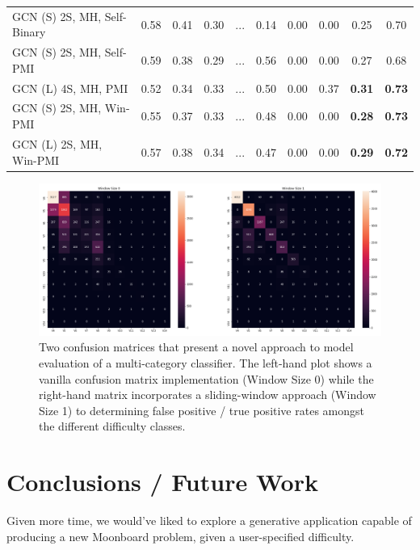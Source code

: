 \documentclass{article}
\begin{document}
\begin{table}[h!]
\begin{tabular}{@{}lccclccccc@{}}
GCN (S) 2S, MH, Self-Binary & 0.58  & 0.41  & 0.30  & ... & 0.14 & 0.00 & 0.00 & 0.25            & 0.70            \\
GCN (S) 2S, MH, Self-PMI    & 0.59  & 0.38  & 0.29  & ... & 0.56 & 0.00 & 0.00 & 0.27            & 0.68            \\
GCN (L) 4S, MH, PMI         & 0.52  & 0.34  & 0.33  & ... & 0.50 & 0.00 & 0.37 & \textbf{0.31}            & \textbf{0.73}            \\
GCN (S) 2S, MH, Win-PMI     & 0.55  & 0.37  & 0.33  & ... & 0.48 & 0.00 & 0.00 & \textbf{0.28}            & \textbf{0.73}            \\
GCN (L) 2S, MH, Win-PMI     & 0.57  & 0.38  & 0.34  & ... & 0.47 & 0.00 & 0.00 & \textbf{0.29}            & \textbf{0.72}            \\ \bottomrule
\end{tabular}
\end{table}

\begin{figure}
\centering
\includegraphics[width=.8\linewidth]{confusion_window}
\caption{Two confusion matrices that present a novel approach to model evaluation of a multi-category classifier. The left-hand plot shows a vanilla confusion matrix implementation (Window Size 0) while the right-hand matrix incorporates a sliding-window approach (Window Size 1) to determining false positive / true positive rates amongst the different difficulty classes.}
\end{figure}

\section{Conclusions / Future Work}
Given more time, we would've liked to explore a generative application \cite{mirza2014conditional} capable of producing a new Moonboard problem, given a user-specified difficulty.

\end{document}
